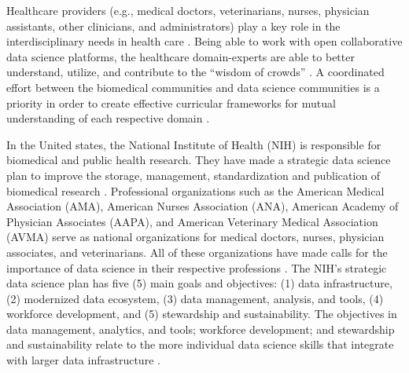 \documentclass[020-persona\_validation.tex]{subfiles}
\begin{document}
    Healthcare providers
    (e.g., medical doctors, veterinarians, nurses, physician assistants, other clinicians, and administrators)
    play a key role in the interdisciplinary needs in health care
    \cite{surowiecki2005wisdom, hoytOverviewTwoOpen2018, payneBiomedicalInformaticsMeets2018}.
    Being able to work with open collaborative data science platforms,
    the healthcare domain-experts are able to better understand, utilize, and contribute to the
    ``wisdom of crowds''
    \cite{surowiecki2005wisdom, hoytOverviewTwoOpen2018, payneBiomedicalInformaticsMeets2018}.
    A coordinated effort between the biomedical communities and data science communities
    is a priority in order to create effective curricular frameworks for mutual understanding
    of each respective domain
    \cite{payneBiomedicalInformaticsMeets2018}.

    In the United states,
    the National Institute of Health (NIH) is responsible for biomedical and public health research.
    They have made a strategic data science plan to improve the
    storage, management, standardization and publication of biomedical research
    \cite{nationalinstitutesofhealthNIHStrategicPlan2020}.
    Professional organizations such as the
    American Medical Association (AMA),
    American Nurses Association (ANA),
    American Academy of Physician Associates (AAPA), and
    American Veterinary Medical Association (AVMA)
    serve as national organizations for medical doctors, nurses, physician associates, and veterinarians.
    All of these organizations have made calls for the importance of data science in their respective professions
    \cite{payneBiomedicalInformaticsMeets2018, americanmedicalassociationAcceleratingChangeMedical2021, americannursesassociationANAEnterpriseAmerican, owenEthicalIntersectionHealthcare2017, nolenArtificialIntelligenceVeterinary2020, nationalinstitutesofhealthNIHStrategicPlan2020}.
    The NIH's strategic data science plan has five (5) main goals and objectives:
    (1) data infrastructure,
    (2) modernized data ecosystem,
    (3) data management, analysis, and tools,
    (4) workforce development, and
    (5) stewardship and sustainability. %
    The objectives in
    data management, analytics, and tools;
    workforce development;
    and stewardship and sustainability
    relate to the more individual data science skills that integrate with larger data infrastructure
    \cite{nationalinstitutesofhealthNIHStrategicPlan2020}.

\end{document}
